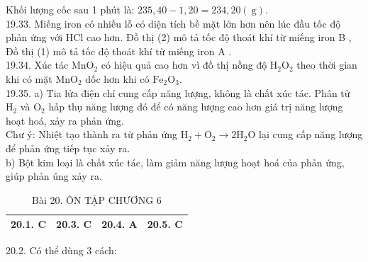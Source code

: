 \documentclass[10pt]{article}
\begin{document}
Khối lượng cốc sau 1 phút là: $235,40-1,20=234,20(\mathrm{~g})$.\\
19.33. Miếng iron có nhiều lỗ có diện tích bề mặt lớn hơn nên lúc đầu tốc độ phản ứng với HCl cao hơn. Đồ thị (2) mô tả tốc độ thoát khí từ miếng iron B , Đồ thị (1) mô tả tốc độ thoát khí từ miếng iron A .\\
19.34. Xúc tác $\mathrm{MnO}_{2}$ có hiệu quả cao hơn vì đồ thị nồng độ $\mathrm{H}_{2} \mathrm{O}_{2}$ theo thời gian khi có mặt $\mathrm{MnO}_{2}$ dốc hơn khi có $\mathrm{Fe}_{2} \mathrm{O}_{3}$.\\
19.35. a) Tia lửa điện chỉ cung cấp năng lượng, không là chất xúc tác. Phân tử $\mathrm{H}_{2}$ và $\mathrm{O}_{2}$ hấp thụ năng lượng đó để có năng lượng cao hơn giá trị năng lượng hoạt hoá, xảy ra phản ứng.\\
Chư ý: Nhiệt tạo thành ra từ phản ứng $\mathrm{H}_{2}+\mathrm{O}_{2} \rightarrow 2 \mathrm{H}_{2} \mathrm{O}$ lại cung cấp năng lượng để phản ứng tiếp tục xảy ra.\\
b) Bột kim loại là chất xúc tác, làm giảm năng lượng hoạt hoá của phản ứng, giúp phản úng xảy ra.

\begin{table}[h]
\begin{center}
\captionsetup{labelformat=empty}
\caption{Bài 20. ÔN TẬP CHƯƠNG 6}
\begin{tabular}{|l|l|l|l|}
\hline
20.1. C & 20.3. C & 20.4. A & 20.5. C \\
\hline
\end{tabular}
\end{center}
\end{table}

20.2. Có thể dùng 3 cách:
\end{document}
